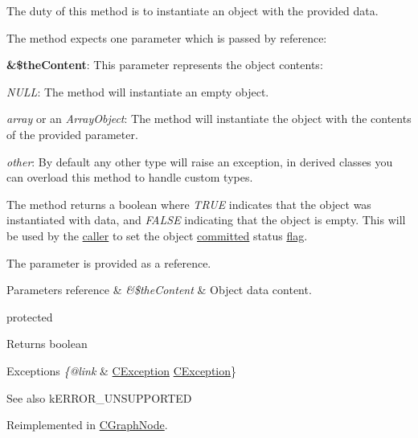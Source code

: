 The duty of this method is to instantiate an object with the provided data.

The method expects one parameter which is passed by reference\-:


\begin{DoxyItemize}
\item {\bfseries \&\$the\-Content}\-: This parameter represents the object contents\-: 
\begin{DoxyItemize}
\item {\itshape N\-U\-L\-L}\-: The method will instantiate an empty object. 
\item {\itshape array} or an {\itshape Array\-Object}\-: The method will instantiate the object with the contents of the provided parameter. 
\item {\itshape other}\-: By default any other type will raise an exception, in derived classes you can overload this method to handle custom types. 
\end{DoxyItemize}
\end{DoxyItemize}

The method returns a boolean where {\itshape T\-R\-U\-E} indicates that the object was instantiated with data, and {\itshape F\-A\-L\-S\-E} indicating that the object is empty. This will be used by the \hyperlink{class_c_persistent_object_a0f0729cfaef48bd1c98c0711c061a7d3}{caller} to set the object \hyperlink{class_c_persistent_object_a6520a7bcecf3f39fd61ec6d08f736e77}{committed} status \hyperlink{}{flag}.

The parameter is provided as a reference.


\begin{DoxyParams}[1]{Parameters}
reference & {\em \&\$the\-Content} & Object data content.\\
\hline
\end{DoxyParams}
protected \begin{DoxyReturn}{Returns}
boolean
\end{DoxyReturn}

\begin{DoxyExceptions}{Exceptions}
{\em \{@link} & \hyperlink{class_c_exception}{C\-Exception} \hyperlink{class_c_exception}{C\-Exception}\}\\
\hline
\end{DoxyExceptions}
\begin{DoxySeeAlso}{See also}
k\-E\-R\-R\-O\-R\-\_\-\-U\-N\-S\-U\-P\-P\-O\-R\-T\-E\-D 
\end{DoxySeeAlso}


Reimplemented in \hyperlink{class_c_graph_node_a90e49bf5e95ccf3c8644196696154268}{C\-Graph\-Node}.

